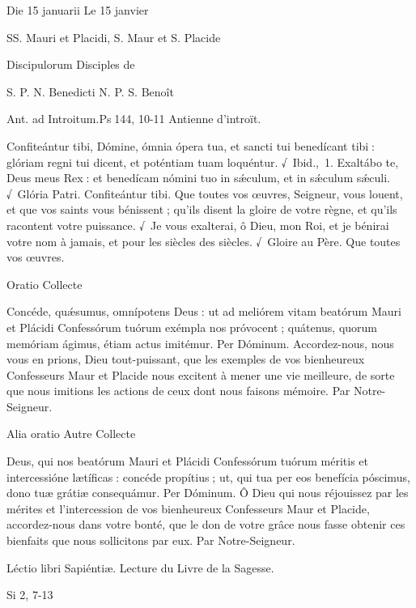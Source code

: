 \begin{paracol}{2}
Die 15 januarii
\switchcolumn
Le 15 janvier
\switchcolumn*

SS. Mauri et Placidi,
\switchcolumn
S. Maur et S. Placide
\switchcolumn*

Discipulorum
\switchcolumn
Disciples de
\switchcolumn*

S. P. N. Benedicti
\switchcolumn
N. P. S. Benoît
\switchcolumn*

Ant. ad Introitum.\hfill Ps 144, 10-11
\switchcolumn
Antienne d’introït.
\switchcolumn*

Confiteántur tibi, Dómine, ómnia  ópera tua, et sancti tui benedícant tibi : glóriam regni tui dicent, et poténtiam tuam loquéntur. √~Ibid., 1. Exaltábo te, Deus meus Rex : et benedícam nómini tuo in sǽculum, et in sǽculum sǽculi. √~Glória Patri. Confiteántur tibi.
\switchcolumn
Que toutes vos œuvres, Seigneur, vous  louent, et que vos saints vous bénissent ; qu’ils disent la gloire de votre règne, et qu’ils racontent votre puissance. √~Je vous exalterai, ô Dieu, mon Roi, et je bénirai votre nom à jamais, et pour les siècles des siècles. √~Gloire au Père. Que toutes vos œuvres.
\switchcolumn*

Oratio
\switchcolumn
Collecte
\switchcolumn*

Concéde, quǽsumus, omnípotens  Deus : ut ad meliórem vitam beatórum Mauri et Plácidi Confessórum tuórum exémpla nos próvocent ; quátenus, quorum memóriam ágimus, étiam actus imitémur. Per Dóminum.
\switchcolumn
Accordez-nous, nous vous en prions,  Dieu tout-puissant, que les exemples de vos bienheureux Confesseurs Maur et Placide nous excitent à mener une vie meilleure, de sorte que nous imitions les actions de ceux dont nous faisons mémoire. Par Notre-Seigneur.
\switchcolumn*

Alia oratio
\switchcolumn
Autre Collecte
\switchcolumn*

Deus, qui nos beatórum Mauri et  Plácidi Confessórum tuórum méritis et intercessióne lætíficas : concéde propítius ; ut, qui tua per eos benefícia póscimus, dono tuæ grátiæ consequámur. Per Dóminum.
\switchcolumn
Ô Dieu qui nous réjouissez par les mérites et l’intercession de vos bienheureux Confesseurs Maur et Placide, accordez-nous dans votre bonté, que le don de votre grâce nous fasse obtenir ces bienfaits que nous sollicitons par eux. Par Notre-Seigneur.
\switchcolumn*

Léctio libri Sapiéntiæ.
\switchcolumn
Lecture du Livre de la Sagesse.
\switchcolumn*

Si 2, 7-13
\switchcolumn


\end{paracol}
